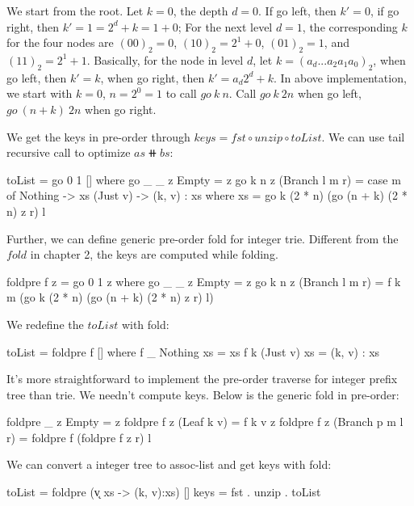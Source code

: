 \documentclass[b5paper]{article}
\begin{document}
\begin{Answer}[ref = {ex:int-tree-lookup}]
{We start from the root. Let $k = 0$, the depth $d = 0$. If go left, then $k' = 0$, if go right, then $k' = 1 = 2^d + k = 1 + 0$; For the next level $d = 1$, the corresponding $k$ for the four nodes are $(00)_2 = 0$, $(10)_2 = 2^1 + 0$, $(01)_2 = 1$, and $(11)_2 = 2^1 + 1$. Basically, for the node in level $d$, let $k = (a_d...a_2 a_1 a_0)_2$, when go left, then $k' = k$, when go right, then $k' = a_d 2^d + k$. In above implementation, we start with $k = 0$, $n = 2^0 = 1$ to call $go\ k\ n$. Call $go\ k\ 2n$ when go left, $go\ (n + k)\ 2n$ when go right.

We get the keys in pre-order through $keys = fst \circ unzip \circ toList$. We can use tail recursive call to optimize $as \doubleplus bs$:

\begin{Haskell}
toList = go 0 1 [] where
  go _ _ z Empty = z
  go k n z (Branch l m r) = case m of
    Nothing -> xs
    (Just v) -> (k, v) : xs
    where xs = go k (2 * n) (go (n + k) (2 * n) z r) l
\end{Haskell}

Further, we can define generic pre-order fold for integer trie. Different from the $fold$ in chapter 2, the keys are computed while folding.

\begin{Haskell}
foldpre f z = go 0 1 z where
  go _ _ z Empty = z
  go k n z (Branch l m r) = f k m (go k (2 * n) (go (n + k) (2 * n) z r) l)
\end{Haskell}

We redefine the $toList$ with fold:

\begin{Haskell}
toList = foldpre f [] where
  f _ Nothing xs = xs
  f k (Just v) xs = (k, v) : xs
\end{Haskell}

It's more straightforward to implement the pre-order traverse for integer prefix tree than trie. We needn't compute keys. Below is the generic fold in pre-order:

\begin{Haskell}
foldpre _ z Empty = z
foldpre f z (Leaf k v) = f k v z
foldpre f z (Branch p m l r) = foldpre f (foldpre f z r) l
\end{Haskell}

We can convert a integer tree to assoc-list and get keys with fold:
\begin{Haskell}
toList = foldpre (\k v xs -> (k, v):xs) []
keys = fst . unzip . toList
\end{Haskell}

}
\end{Answer}
\end{document}
